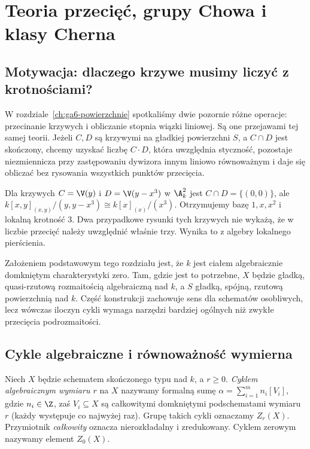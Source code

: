 \chapter{Teoria przecięć, grupy Chowa i klasy Cherna}
\label{ch:ga7-chow-chern}

\section{Motywacja: dlaczego krzywe musimy liczyć z krotnościami?}
\label{sec:ga7-motivation}

W rozdziale~\ref{ch:ga6-powierzchnie} spotkaliśmy dwie pozornie różne
operacje: przecinanie krzywych i obliczanie stopnia wiązki liniowej.
Są one przejawami tej samej teorii. Jeżeli $C,D$ są krzywymi na
gładkiej powierzchni $S$, a $C\cap D$ jest skończony, chcemy
uzyskać liczbę $C\cdot D$, która uwzględnia styczność,
pozostaje niezmiennicza przy zastępowaniu dywizora innym
liniowo równoważnym i daje się obliczać bez rysowania
wszystkich punktów przecięcia.

\begin{przyklad}
Dla krzywych $C=\V(y)$ i $D=\V(y-x^3)$ w $\A^2_k$ jest
$C\cap D=\{(0,0)\}$, ale
$k[x,y]_{(x,y)}/(y,y-x^3)\cong k[x]_{(x)}/(x^3)$.
Otrzymujemy bazę $1,x,x^2$ i lokalną krotność $3$.
Dwa przypadkowe rysunki tych krzywych nie wykażą,
że w liczbie przecięć należy uwzględnić właśnie trzy.
Wynika to z algebry lokalnego pierścienia.
\end{przyklad}

Założeniem podstawowym tego rozdziału jest, że $k$ jest
ciałem algebraicznie domkniętym charakterystyki zero.
Tam, gdzie jest to potrzebne, $X$ będzie gładką,
quasi-rzutową rozmaitością algebraiczną nad $k$,
a $S$ gładką, spójną, rzutową powierzchnią nad $k$.
Część konstrukcji zachowuje sens dla schematów osobliwych,
lecz wówczas iloczyn cykli wymaga narzędzi bardziej ogólnych
niż zwykłe przecięcia podrozmaitości.

\section{Cykle algebraiczne i równoważność wymierna}
\label{sec:ga7-cycles}

\begin{definicja}
\label{def:ga7-cycles}
Niech $X$ będzie schematem skończonego typu nad $k$, a $r\ge0$.
\emph{Cyklem algebraicznym wymiaru $r$} na $X$ nazywamy formalną
sumę $\alpha=\sum_{i=1}^m n_i[V_i]$, gdzie $n_i\in\Z$,
zaś $V_i\subseteq X$ są całkowitymi domkniętymi podschematami
wymiaru $r$ (każdy występuje co najwyżej raz).
Grupę takich cykli oznaczamy $Z_r(X)$.
Przymiotnik \emph{całkowity} oznacza nierozkładalny i zredukowany.
Cyklem zerowym nazywamy element $Z_0(X)$.
\end{definicja}

